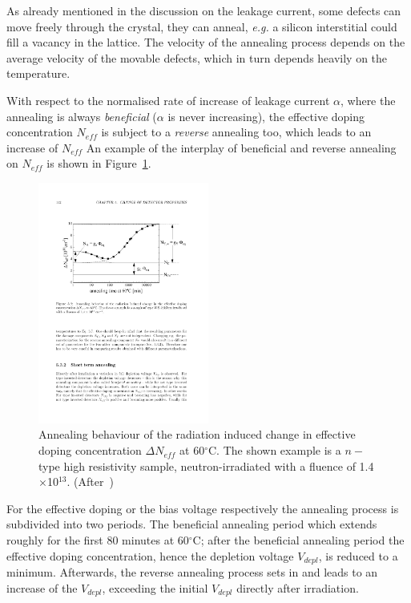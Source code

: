  
As already mentioned in the discussion on the leakage current,  some defects can move freely 
through the crystal, they can anneal, {\it e.g.} a silicon interstitial 
could fill a vacancy in the lattice. The velocity of the annealing process depends on the average 
velocity of the movable defects, which in turn depends heavily on the temperature.


With respect to the normalised rate of increase of leakage current $\alpha$, where the annealing 
is always {\it beneficial} ($\alpha$ is never increasing), the effective doping concentration $N_{eff}$
is subject to a {\it reverse} annealing too, which leads to an increase of $N_{eff}$
An example of the interplay of beneficial and reverse annealing on $N_{eff}$ is shown in 
Figure~\ref{fig:Neff_annealing}.

\begin{figure}
\centering
\includegraphics[width=0.5\textwidth]{Neff_annealing.pdf}
\caption{\label{fig:Neff_annealing}Annealing behaviour of the radiation induced change in effective 
doping concentration $\Delta N_{eff}$ at 60$^{\circ}$C. The shown example is a $n-$type high 
resistivity sample, neutron-irradiated with a fluence of 1.4$\times$10$^{13}$. 
(After~\cite{moll-thesis})}
\end{figure}


For the effective doping or the bias voltage respectively the annealing process is subdivided into 
two periods. 
The beneficial annealing period which extends roughly for the first 80 minutes at 60$^{\circ}$C; 
after the beneficial annealing period the effective doping concentration, hence the depletion voltage 
$V_{depl}$, is  reduced to a minimum. Afterwards, the reverse annealing process sets in and leads 
to an increase 
of the $V_{depl}$, exceeding the initial $V_{depl}$ directly after 
irradiation.

